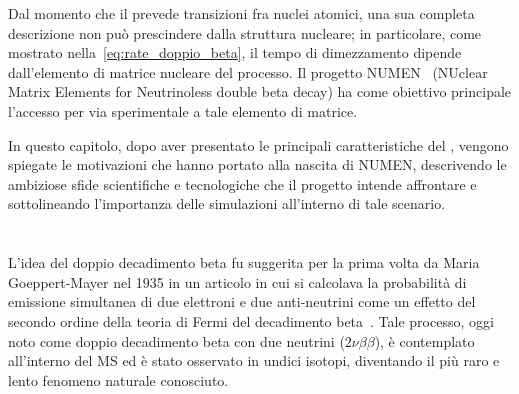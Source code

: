 %
Dal momento che il \doppiobeta{} prevede transizioni fra nuclei atomici, una sua completa descrizione non può prescindere dalla struttura nucleare; in particolare, come mostrato nella~\ref{eq:rate_doppio_beta}, il tempo di dimezzamento dipende dall'elemento di matrice nucleare del processo.
Il progetto NUMEN~\cite{cappuzzello:epja18} (NUclear Matrix Elements for Neutrinoless double beta decay) ha come obiettivo principale l'accesso per via sperimentale a tale elemento di matrice.
 
In questo capitolo, dopo aver presentato le principali caratteristiche del \doppiobeta{}, vengono spiegate le motivazioni che hanno portato alla nascita di NUMEN, descrivendo le ambiziose sfide scientifiche e tecnologiche che il progetto intende affrontare e sottolineando l'importanza delle simulazioni all'interno di tale scenario.




\section{} \label{sez:doppio_beta_senza_neutrini}

L'idea del doppio decadimento beta fu suggerita per la prima volta da Maria Goeppert-Mayer nel 1935 in un articolo in cui si calcolava la probabilità di emissione simultanea di due elettroni e due anti-neutrini come un effetto del secondo ordine della teoria di Fermi del decadimento beta~\cite{goeppert-mayer:pr35}. 
Tale processo, oggi noto come doppio decadimento beta con due neutrini ($ 2\nu\beta\beta $), è contemplato all'interno del MS ed è stato osservato in undici isotopi, diventando il più raro e lento fenomeno naturale conosciuto.
 

